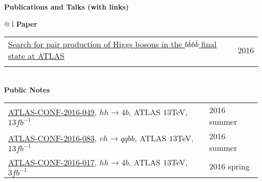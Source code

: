 \documentclass[letterpaper,11pt,oneside]{article}
\newcommand{\blue}[1]{\textcolor[rgb]{0,0,0.9}{#1}}
\begin{document}
\newpage
\raggedright
 \textbf{\Large{Publications and Talks (with links)}} \\
\vspace{-0.5cm}
\normalsize
\begin{flushleft}
\hspace{1cm}
 \begin{tabular}{@{} l}
    \textbf{Paper} \\ 
    \begin{tabular}{@{} l l }
    \blue{\href{http://arxiv.org/abs/1606.04782}{Search for pair production of Higgs bosons in the $b\bar{b}b\bar{b}$ final state at ATLAS}} & 2016 \\
    \hspace{0.8\linewidth} & \hspace{0.1\linewidth} \\
     \end{tabular}
     \\
    \textbf{Public Notes} \\ 
    \begin{tabular}{@{} l l }
    \blue{\href{https://atlas.web.cern.ch/Atlas/GROUPS/PHYSICS/CONFNOTES/ATLAS-CONF-2016-049/}{ATLAS-CONF-2016-049}}, $hh\to4b$, ATLAS $13$TeV, $13 fb^{-1}$ & 2016 summer\\
    \blue{\href{https://atlas.web.cern.ch/Atlas/GROUPS/PHYSICS/CONFNOTES/ATLAS-CONF-2016-083/}{ATLAS-CONF-2016-083}}, $vh\to qqbb$, ATLAS $13$TeV, $13 fb^{-1}$ & 2016 summer\\
    \blue{\href{https://atlas.web.cern.ch/Atlas/GROUPS/PHYSICS/CONFNOTES/ATLAS-CONF-2016-017/}{ATLAS-CONF-2016-017}}, $hh\to4b$, ATLAS $13$TeV, $3 fb^{-1}$ & 2016 spring\\
    

\end{tabular}
\end{tabular}
\end{flushleft}
\end{document}
